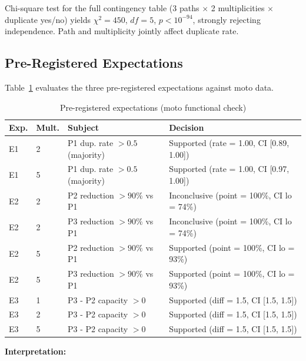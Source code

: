 Chi-square test for the full contingency table (3 paths $\times$ 2 multiplicities $\times$ duplicate yes/no) yields $\chi^2 = 450$, $df = 5$, $p < 10^{-94}$, strongly rejecting independence. Path and multiplicity jointly affect duplicate rate.

\subsection{Pre-Registered Expectations}

Table~\ref{tab:eval_expectations} evaluates the three pre-registered expectations against moto data.

\begin{table}[h]
\centering
\caption{Pre-registered expectations (moto functional check)}
\label{tab:eval_expectations}
\begin{tabular}{llp{4cm}l}
\hline
\textbf{Exp.} & \textbf{Mult.} & \textbf{Subject} & \textbf{Decision} \\
\hline
E1 & 2 & P1 dup. rate $> 0.5$ (majority) & Supported (rate = 1.00, CI [0.89, 1.00]) \\
E1 & 5 & P1 dup. rate $> 0.5$ (majority) & Supported (rate = 1.00, CI [0.97, 1.00]) \\
\hline
E2 & 2 & P2 reduction $> 90\%$ vs P1 & Inconclusive (point = 100\%, CI lo = 74\%) \\
E2 & 2 & P3 reduction $> 90\%$ vs P1 & Inconclusive (point = 100\%, CI lo = 74\%) \\
E2 & 5 & P2 reduction $> 90\%$ vs P1 & Supported (point = 100\%, CI lo = 93\%) \\
E2 & 5 & P3 reduction $> 90\%$ vs P1 & Supported (point = 100\%, CI lo = 93\%) \\
\hline
E3 & 1 & P3 - P2 capacity $> 0$ & Supported (diff = 1.5, CI [1.5, 1.5]) \\
E3 & 2 & P3 - P2 capacity $> 0$ & Supported (diff = 1.5, CI [1.5, 1.5]) \\
E3 & 5 & P3 - P2 capacity $> 0$ & Supported (diff = 1.5, CI [1.5, 1.5]) \\
\hline
\end{tabular}
\end{table}

\textbf{Interpretation:}


